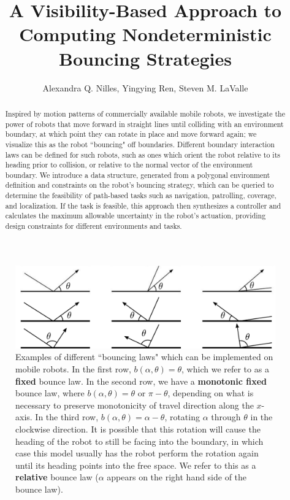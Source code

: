 \documentclass[]{styles/svproc}  %
\title{A Visibility-Based Approach to Computing Nondeterministic Bouncing
Strategies}
\author{Alexandra Q. Nilles, Yingying Ren, Steven M. LaValle%
}
\institute{University of Illinois at Urbana-Champaign}
\begin{document}
\maketitle

\begin{abstract}
Inspired by motion patterns of commercially available mobile robots, we investigate the power of robots that 
move forward in straight lines
until colliding with an environment boundary, at which point they can rotate in
place and move forward again; we visualize this as the robot ``bouncing" off
boundaries. Different boundary interaction laws can be
defined for such robots, such as ones which orient the robot relative to its
heading prior to collision, or relative to the normal vector of the environment
boundary. We introduce a data structure, generated from a polygonal environment
 definition and constraints on the robot's bouncing strategy, which can be
queried to determine the feasibility of path-based tasks such as navigation,
patrolling, coverage, and localization. If the task is feasible, this
approach then synthesizes a controller and calculates the maximum allowable 
uncertainty in the robot's actuation, providing design constraints for different 
environments and tasks.
\end{abstract}

\begin{figure}
    \includegraphics[width=0.8\linewidth]{figures/bounce_examples.pdf}
    \centering
    \caption[test]{\label{fig:bex}Examples of different ``bouncing laws" which can be implemented on
mobile robots. In the first row, $b(\alpha, \theta) = \theta$, which we refer to
as a \textbf{fixed} bounce law. In the second row, we have a \textbf{monotonic
fixed} bounce law, where
$b(\alpha, \theta) = \theta$ or $\pi-\theta$, depending on what is necessary to
preserve monotonicity of travel direction along the $x$-axis. In the third
row, $b(\alpha, \theta) = \alpha - \theta$, rotating $\alpha$ through $\theta$ in the clockwise
direction. It is possible that this rotation will cause the 
heading of the robot to still be facing into the boundary, in which case this model usually has the robot 
perform the rotation again until its heading points into the free space. We
refer to this as a \textbf{relative} bounce law ($\alpha$ appears on the
right hand side of the bounce law).
}
\end{figure}
\end{document}
